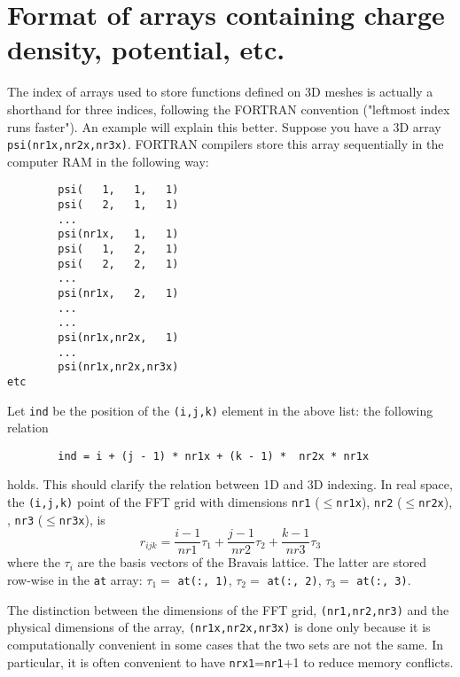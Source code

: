 \documentclass[12pt,a4paper]{article}
\begin{document}

\section{Format of arrays containing charge density, potential, etc.}
The index of arrays used to store functions defined on 3D meshes is
actually a shorthand for three indices, following the FORTRAN convention
("leftmost index runs faster"). An example will explain this better.
Suppose you have a 3D array \texttt{psi(nr1x,nr2x,nr3x)}. FORTRAN
compilers store this array sequentially  in the computer RAM in the following way:
\begin{verbatim}
        psi(   1,   1,   1)
        psi(   2,   1,   1)
        ...
        psi(nr1x,   1,   1)
        psi(   1,   2,   1)
        psi(   2,   2,   1)
        ...
        psi(nr1x,   2,   1)
        ...
        ...
        psi(nr1x,nr2x,   1)
        ...
        psi(nr1x,nr2x,nr3x)
etc
\end{verbatim}
Let \texttt{ind} be the position of the \texttt{(i,j,k)} element in the above list:
the following relation
\begin{verbatim}
        ind = i + (j - 1) * nr1x + (k - 1) *  nr2x * nr1x
\end{verbatim}
holds. This should clarify the relation between 1D and 3D indexing. In real
space, the \texttt{(i,j,k)} point of the FFT grid with dimensions
\texttt{nr1} ($\le$\texttt{nr1x}),
\texttt{nr2}  ($\le$\texttt{nr2x}), , \texttt{nr3} ($\le$\texttt{nr3x}), is
$$
r_{ijk}=\frac{i-1}{nr1} \tau_1  +  \frac{j-1}{nr2} \tau_2 +
\frac{k-1}{nr3} \tau_3
$$
where the $\tau_i$ are the basis vectors of the Bravais lattice.
The latter are stored row-wise in the \texttt{at} array:
$\tau_1 = $ \texttt{at(:, 1)},
$\tau_2 = $ \texttt{at(:, 2)},
$\tau_3 = $ \texttt{at(:, 3)}.

The distinction between the dimensions of the FFT grid,
\texttt{(nr1,nr2,nr3)} and the physical dimensions of the array,
\texttt{(nr1x,nr2x,nr3x)} is done only because it is computationally
convenient in some cases that the two sets are not the same.
In particular, it is often convenient to have \texttt{nrx1}=\texttt{nr1}+1
to reduce memory conflicts.
\end{document}
